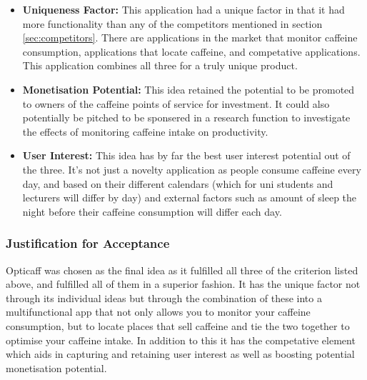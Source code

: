 \begin{itemize}
	\item{\textbf{Uniqueness Factor:} This application had a unique factor in that it had more functionality than any of the competitors mentioned in section \ref{sec:competitors}}. There are applications in the market that monitor caffeine consumption, applications that locate caffeine, and competative applications. This application combines all three for a truly unique product. 
	\item{\textbf{Monetisation Potential:} This idea retained the potential to be promoted to owners of the caffeine points of service for investment. It could also potentially be pitched to be sponsered in a research function to investigate the effects of monitoring caffeine intake on productivity.}
	\item{\textbf{User Interest:} This idea has by far the best user interest potential out of the three. It's not just a novelty application as people consume caffeine every day, and based on their different calendars (which for uni students and lecturers will differ by day) and external factors such as amount of sleep the night before their caffeine consumption will differ each day. }
\end{itemize}

\subsubsection{Justification for Acceptance}
Opticaff was chosen as the final idea as it fulfilled all three of the criterion listed above, and fulfilled all of them in a superior fashion. It has the unique factor not through its individual ideas but through the combination of these into a multifunctional app that not only allows you to monitor your caffeine consumption, but to locate places that sell caffeine and tie the two together to optimise your caffeine intake. In addition to this it has the competative element which aids in capturing and retaining user interest as well as boosting potential monetisation potential. 

